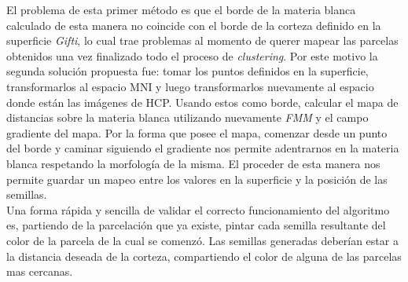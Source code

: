 El problema de esta primer m\'etodo es que el borde de la materia blanca calculado
de esta manera no coincide con el borde de la corteza definido en la superficie
\textit{Gifti}, lo cual trae problemas al momento de querer mapear las parcelas
obtenidos una vez finalizado todo el proceso de \textit{clustering}. Por este
motivo la segunda soluci\'on propuesta fue: tomar los puntos definidos en la 
superficie, transformarlos al espacio MNI y luego transformarlos nuevamente al 
espacio donde est\'an las im\'agenes de HCP. Usando estos como borde, calcular 
el mapa de distancias sobre la materia blanca utilizando nuevamente \textit{FMM}
y el campo gradiente del mapa. Por la forma que posee el mapa, comenzar desde un
punto del borde y caminar siguiendo el gradiente nos permite adentrarnos en la 
materia blanca respetando la morfolog\'ia de la misma. El proceder de esta manera
nos permite guardar un mapeo entre los valores en la superficie y la posici\'on
de las semillas.\\

Una forma r\'apida y sencilla de validar el correcto funcionamiento del algoritmo
es, partiendo de la parcelaci\'on que ya existe, pintar cada semilla resultante 
del color de la parcela de la cual se comenz\'o. Las semillas generadas
deber\'ian estar a la distancia deseada de la corteza, compartiendo el color de
alguna de las parcelas mas cercanas.
